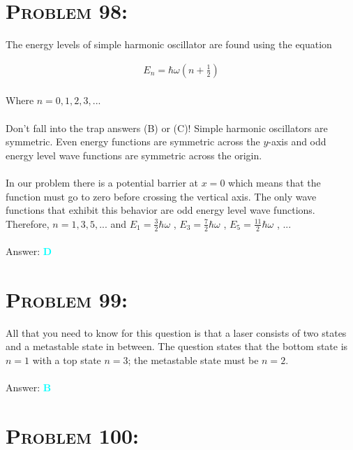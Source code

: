 \documentclass{article}
\begin{document}
\section{\textsc{Problem 98:}} The energy levels of simple harmonic oscillator are found using the equation

\begin{gather}
E_{n} = \hbar \omega \left(   n + \frac{1}{2}    \right)
\end{gather}
\\
Where $n = 0 , 1 , 2 , 3 , ...$ \\
\\
Don't fall into the trap answers (B) or (C)! Simple harmonic oscillators are symmetric. Even energy functions are symmetric across the $y$-axis and odd energy level wave functions are symmetric across the origin. \\
\\
In our problem there is a potential barrier at $x=0$ which means that the function must go to zero before crossing the vertical axis. The only wave functions that exhibit this behavior are odd energy level wave functions. Therefore, $n = 1,3,5,...$ and $E_{1} = \frac{3}{2}\hbar \omega$ , $E_{3} = \frac{7}{2}\hbar \omega$ , $E_{5} = \frac{11}{2}\hbar \omega$ , ...
\\\\
Answer: \textbf{\textcolor{cyan}D}\\



\section{\textsc{Problem 99:}} All that you need to know for this question is that a laser consists of two states and a metastable state in between. The question states that the bottom state is $n =1$ with a top state $n=3$; the metastable state must be $n=2$.
\\\\
Answer: \textbf{\textcolor{cyan}B}\\


\section{\textsc{Problem 100:}} 
\end{document}
